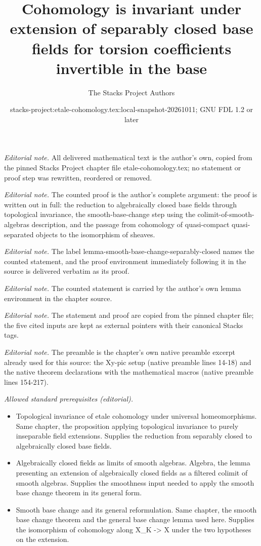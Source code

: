 \documentclass[10pt,a4paper]{amsart}
\title{Cohomology is invariant under extension of separably closed base fields for torsion coefficients invertible in the base}
\author{The Stacks Project Authors}
\date{stacks-project:etale-cohomology.tex:local-snapshot-20261011; GNU FDL 1.2 or later}
\theoremstyle{plain}
\theoremstyle{definition}
\theoremstyle{remark}
\numberwithin{equation}{subsection}
\begin{document}
\maketitle
\noindent\textit{Editorial note.} All delivered mathematical text is the author's own, copied from the pinned Stacks Project chapter file etale-cohomology.tex; no statement or proof step was rewritten, reordered or removed.\par\medskip
\noindent\textit{Editorial note.} The counted proof is the author's complete argument: the proof is written out in full: the reduction to algebraically closed base fields through topological invariance, the smooth-base-change step using the colimit-of-smooth-algebras description, and the passage from cohomology of quasi-compact quasi-separated objects to the isomorphism of sheaves.\par\medskip
\noindent\textit{Editorial note.} The label lemma-smooth-base-change-separably-closed names the counted statement, and the proof environment immediately following it in the source is delivered verbatim as its proof.\par\medskip
\noindent\textit{Editorial note.} The counted statement is carried by the author's own lemma environment in the chapter source.\par\medskip
\noindent\textit{Editorial note.} The statement and proof are copied from the pinned chapter file; the five cited inputs are kept as external pointers with their canonical Stacks tags.\par\medskip
\noindent\textit{Editorial note.} The preamble is the chapter's own native preamble excerpt already used for this source: the Xy-pic setup (native preamble lines 14-18) and the native theorem declarations with the mathematical macros (native preamble lines 154-217).\par\medskip
\noindent\textit{Allowed standard prerequisites (editorial).}\begin{itemize}
\item Topological invariance of etale cohomology under universal homeomorphisms. Same chapter, the proposition applying topological invariance to purely inseparable field extensions. Supplies the reduction from separably closed to algebraically closed base fields.
\item Algebraically closed fields as limits of smooth algebras. Algebra, the lemma presenting an extension of algebraically closed fields as a filtered colimit of smooth algebras. Supplies the smoothness input needed to apply the smooth base change theorem in its general form.
\item Smooth base change and its general reformulation. Same chapter, the smooth base change theorem and the general base change lemma used here. Supplies the isomorphism of cohomology along X\_K -> X under the two hypotheses on the extension.
\end{itemize}\medskip
\end{document}
